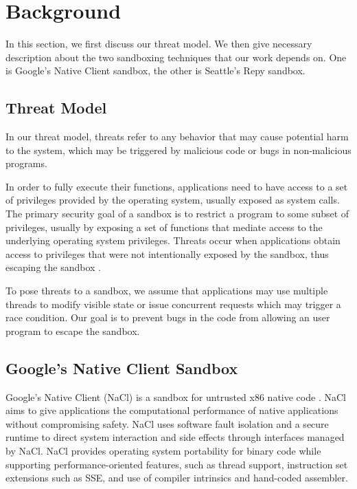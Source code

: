 \section{Background}
\label{sec.background}

In this section, we first discuss our threat model. We then give necessary description about the two sandboxing 
techniques that our work depends on. One is Google's Native Client sandbox, the other is Seattle's Repy sandbox. 

\subsection{Threat Model}

In our threat model, threats refer to any behavior that may cause potential harm to the system, 
which may be triggered by malicious code or bugs in non-malicious programs.

In order to fully execute their functions, applications need to have access to a set of privileges provided by 
the operating system, usually exposed as system calls. The primary security goal of a sandbox is to restrict a program 
to some subset of privileges, usually by exposing a set of functions that mediate access to the underlying 
operating system privileges. Threats occur when applications obtain access to privileges that were not intentionally 
exposed by the sandbox, thus escaping the sandbox \cite{Repy:10}.

To pose threats to a sandbox, we assume that applications may use multiple threads to modify visible state or issue 
concurrent requests which may trigger a race condition. Our goal is to prevent bugs in the code from allowing an user 
program to escape the sandbox.


\subsection{Google's Native Client Sandbox}

Google's Native Client (NaCl) is a sandbox for untrusted x86 native code \cite{NaCl:09}. NaCl aims to give applications 
the computational performance of native applications without compromising safety. NaCl uses software fault isolation 
and a secure runtime to direct system interaction and side effects through interfaces managed by NaCl. NaCl provides 
operating system portability for binary code while supporting performance-oriented features, such as thread support, 
instruction set extensions such as SSE, and use of compiler intrinsics and hand-coded assembler. 

